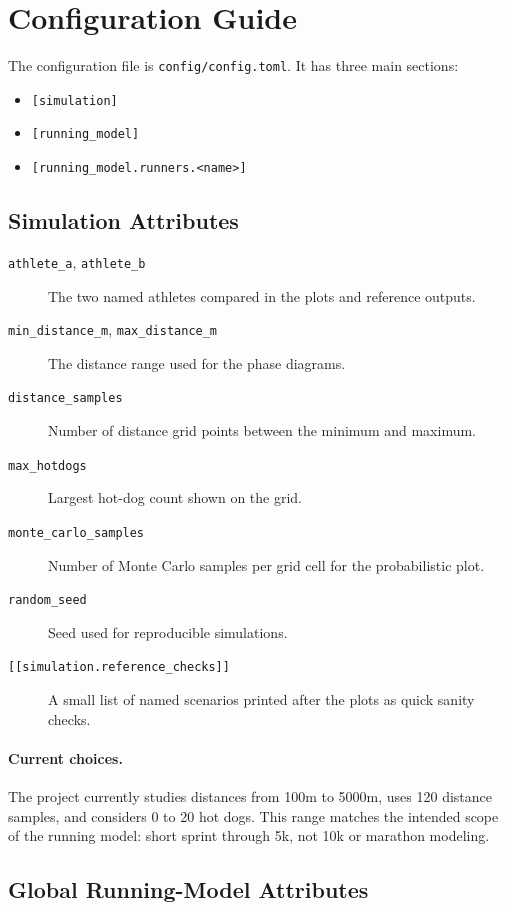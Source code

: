 \documentclass[11pt]{article}
\begin{document}
\section*{Configuration Guide}

The configuration file is \texttt{config/config.toml}. It has three main sections:
\begin{itemize}
    \item \texttt{[simulation]}
    \item \texttt{[running\_model]}
    \item \texttt{[running\_model.runners.<name>]}
\end{itemize}

\subsection*{Simulation Attributes}

\begin{description}
    \item[\texttt{athlete\_a}, \texttt{athlete\_b}] The two named athletes compared in the plots and reference outputs.
    \item[\texttt{min\_distance\_m}, \texttt{max\_distance\_m}] The distance range used for the phase diagrams.
    \item[\texttt{distance\_samples}] Number of distance grid points between the minimum and maximum.
    \item[\texttt{max\_hotdogs}] Largest hot-dog count shown on the grid.
    \item[\texttt{monte\_carlo\_samples}] Number of Monte Carlo samples per grid cell for the probabilistic plot.
    \item[\texttt{random\_seed}] Seed used for reproducible simulations.
    \item[\texttt{[[simulation.reference\_checks]]}] A small list of named scenarios printed after the plots as quick sanity checks.
\end{description}

\paragraph{Current choices.}
The project currently studies distances from 100m to 5000m, uses 120 distance samples, and considers 0 to 20 hot dogs. This range matches the intended scope of the running model: short sprint through 5k, not 10k or marathon modeling.

\subsection*{Global Running-Model Attributes}
\end{document}
